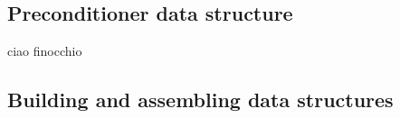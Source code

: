 \subsection{Preconditioner data structure}
\label{sec:prec}
\hypertarget{precdata}{ciao finocchio}



\subsection{Building and assembling data structures}




